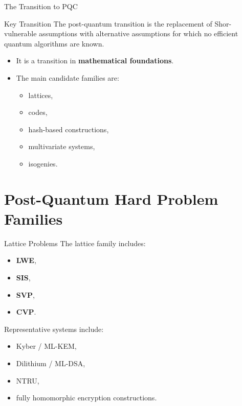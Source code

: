 \documentclass[serif, aspectratio=169]{beamer}
\begin{document}
\begin{frame}{The Transition to PQC}
	\begin{block}{Key Transition}
		The post-quantum transition is the replacement of Shor-vulnerable assumptions with alternative assumptions for which no efficient quantum algorithms are known.
	\end{block}
	
	\begin{itemize}
		\item It is a transition in \textbf{mathematical foundations}.
		\item The main candidate families are:
		\begin{itemize}
			\item lattices,
			\item codes,
			\item hash-based constructions,
			\item multivariate systems,
			\item isogenies.
		\end{itemize}
	\end{itemize}
\end{frame}

\section{Post-Quantum Hard Problem Families}

\begin{frame}{Lattice Problems}
	The lattice family includes:
	\begin{itemize}
		\item \textbf{LWE},
		\item \textbf{SIS},
		\item \textbf{SVP},
		\item \textbf{CVP}.
	\end{itemize}
	
	Representative systems include:
	\begin{itemize}
		\item Kyber / ML-KEM,
		\item Dilithium / ML-DSA,
		\item NTRU,
		\item fully homomorphic encryption constructions.
	\end{itemize}
\end{frame}

	
\end{document}
